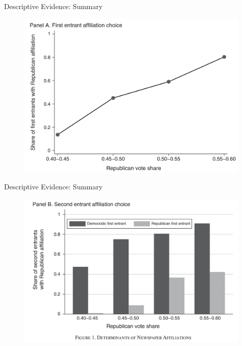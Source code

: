 \documentclass{beamer}
\begin{document}
\begin{frame}[t]{Descriptive Evidence: Summary}
  \begin{figure}
  \begin{center}
    \includegraphics[scale=0.17]{Fig1A.png}
  \end{center}
  \end{figure}
\end{frame}

\begin{frame}[t]{Descriptive Evidence: Summary}
  \begin{figure}
  \begin{center}
    \includegraphics[scale=0.17]{Fig1B.png}
  \end{center}
  \end{figure}
\end{frame}
\end{document}
